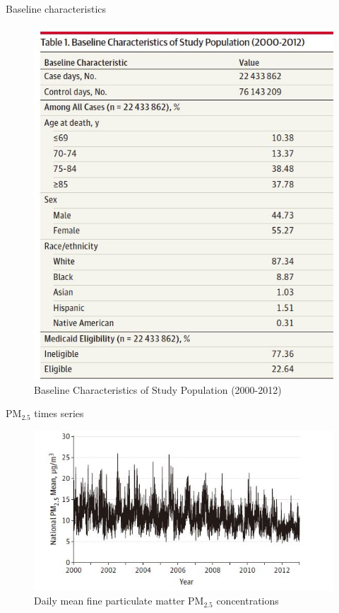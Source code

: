 \documentclass[ignorenonframetext,]{beamer}
\begin{document}
\begin{frame}{Baseline characteristics}

\begin{figure}
\centering
\includegraphics{p1.JPG}
\caption{Baseline Characteristics of Study Population (2000-2012)}
\end{figure}

\end{frame}

\begin{frame}{PM\(_{2.5}\) times series}

\begin{figure}
\centering
\includegraphics{p2.JPG}
\caption{Daily mean fine particulate matter PM\(_{2.5}\) concentrations}
\end{figure}

\end{frame}
\end{document}
